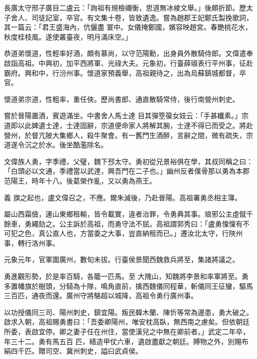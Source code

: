 \begin{pinyinscope}
 長廣太守邢子廣目二盧云：「詢祖有規檢禰衡，思道無冰棱文舉。」後頗折節。歷太子舍人、司徒記室，卒官。有文集十卷，皆致遺逸。嘗為趙郡王妃鄭氏製挽歌詞，其一篇云：「君王盛海內，伉儷盡
 寰中。女儀掩鄭國，嬪容映趙宮。春艷桃花水，秋度桂枝風。遂使叢臺夜，明月滿床空。」



 恭道弟懷道，性輕率好酒，頗有慕尚，以守范陽勳，出身員外散騎侍郎。文偉遣奉啟詣高祖。中興初，加平西將軍、光祿大夫。元象初，行臺薛琡表行平州事，征赴霸府。興和中，行汾州事。懷道家預義舉，高祖親待之，出為烏蘇鎮城都督，卒官。



 懷道弟宗道，性粗率，重任俠。歷尚書郎、通直散騎常侍，後行南營州刺史。



 嘗於晉陽置酒，賓遊滿坐。中書舍人馬士達
 目其彈箜篌女妓云：「手甚纖素。」宗道即以此婢遺士達，士達固辭，宗道便命家人將解其腕，士達不得已而受之。將赴營州，於督亢陂大集鄉人，殺牛聚會。有一舊門生酒醉，言辭之間，微有疏失，宗道遂令沉之於水。後坐酷濫除名。



 文偉族人勇，字季禮，父璧，魏下邳太守。勇初從兄景裕俱在學，其叔同稱之曰：「白頭必以文通，季禮當以武達，興吾門在二子也。」幽州反者僕骨那以勇為本郡范陽王，時年十八。後葛榮作亂，又以勇為燕王。



 義
 旗之起也，盧文偉召之，不應。爾朱滅後，乃赴晉陽。高祖署勇丞相主簿。



 屬山西霜儉，運山東鄉租輸，皆令載實，違者治罪，令勇典其事。琅邪公主虛僦千餘車，勇繩劾之。公主訴於高祖，而勇守法不屈。高祖謂郭秀曰：「盧勇懍懍有不可犯之色，真公直人也，方當委之大事，豈直納租而已。」遷汝北太守，行陜州事，轉行洛州事。



 元象元年，官軍圍廣州，數旬未拔。行臺侯景聞西魏救兵將至，集諸將議之。



 勇進觀形勢，於是率百騎，各籠一匹馬。至
 大隗山，知魏將李景和率軍將至。勇多置幡旗於樹頭，分騎為十隊，鳴角直前，擒西魏儀同程華，斬儀同王征蠻，驅馬三百匹，通夜而還。廣州守將駱超以城降，高祖令勇行廣州事。



 以功授儀同三司、陽州刺史，鎮宜陽。叛民韓木蘭、陳忻等常為邊患，勇大破之。啟求入朝，高祖賜勇書曰：「吾委卿陽州，唯安枕高臥，無西南之慮矣。但依朝廷所委，表啟宜停。卿之妻子任在州住，當使漢兒之中無在卿前者。」武定二年卒，年三十二。勇有馬五百
 匹，繕造甲仗六車，遺啟盡獻之朝廷。賻物之外，別賜布絹四千匹。贈司空、冀州刺史，謚曰武貞侯。




\end{pinyinscope}
